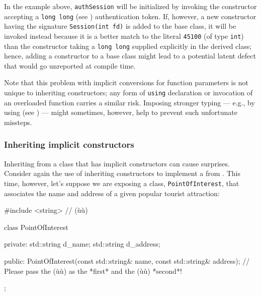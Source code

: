 \noindent In the example above, \lstinline!authSession! will be initialized by
invoking the constructor accepting a \lstinline!long!~\lstinline!long! (see ) 
authentication token. If, however, a new
constructor having the signature \lstinline!Session(int!~\lstinline!fd)! is added to the
base class, it will be invoked instead because it is a better match to the
literal \lstinline!45100! (of type \lstinline!int!) than the constructor
taking a \lstinline!long!~\lstinline!long! supplied explicitly in the derived
class; hence, adding a constructor to a base class might lead to a
potential latent defect that would go unreported at compile
time.

Note that this problem with implicit conversions for function parameters is not unique
to inheriting constructors; any form of \lstinline!using! declaration or
invocation of an overloaded function carries a similar risk. Imposing
stronger typing --- e.g., by using  (see ) 
--- might sometimes, however, help to prevent such
unfortunate missteps.

\subsubsection[Inheriting \emph{implicit} constructors]{Inheriting {\sfbsubsubsecitalRomeo implicit} constructors}\label{beware-of-inheriting-implicit-constructors}

Inheriting from a class that has implicit constructors can cause
surprises. Consider again the use of inheriting constructors to
implement a  from . 
This time, however, let's suppose we are
exposing a class,
\lstinline!PointOfInterest!, that associates the name and address of a
given popular tourist attraction:

\begin{emcppslisting}[language=C++]
#include <string>  // (ù{}ù)

class PointOfInterest
{
private:
    std::string d_name;
    std::string d_address;

public:
    PointOfInterest(const std::string& name, const std::string& address);
        // Please pass the (ù{}ù) as the *first* and the (ù{}ù) *second*!
};
\end{emcppslisting}
    
